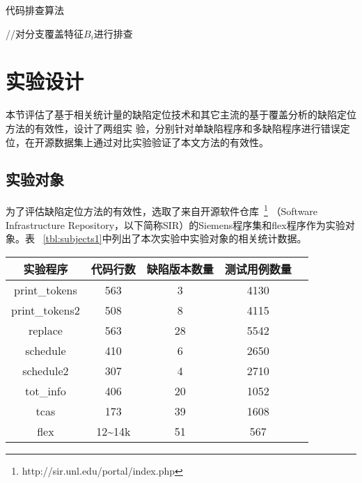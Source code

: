 \begin{algorithm}[H]
\caption{代码排查算法}\label{alg:search}
 {
      //对分支覆盖特征$B_i$进行排查 \\
}
\end{algorithm}

\section{实验设计}
本节评估了基于相关统计量的缺陷定位技术和其它主流的基于覆盖分析的缺陷定位方法的有效性，设计了两组实
验，分别针对单缺陷程序和多缺陷程序进行错误定位，在开源数据集上通过对比实验验证了本文方法的有效性。

\subsection{实验对象}\label{subjects1}

为了评估缺陷定位方法的有效性，选取了来自开源软件仓库~\footnote{http://sir.unl.edu/portal/index.php}
（Software Infrastructure Repository，以下简称SIR）的Siemens程序集和flex程序作为实验对象。表
~\ref{tbl:subjects1}中列出了本次实验中实验对象的相关统计数据。


\begin{center}
\zihaowu
{}\label{tbl:subjects1}
\begin{tabular}{ccccc}
\toprule
实验程序 & 代码行数 & 缺陷版本数量 & 测试用例数量\\ \midrule
print\_tokens & 563 & 3 &4130\\ 
print\_tokens2 & 508 & 8 & 4115\\ 
replace & 563 & 28 & 5542\\ 
schedule & 410 & 6 & 2650\\ 
schedule2 & 307 & 4 & 2710\\ 
tot\_info & 406 & 20 & 1052\\ 
tcas & 173 & 39 & 1608\\ 
flex & 12\textasciitilde14k & 51 & 567\\ \bottomrule
\end{tabular}
\end{center}

